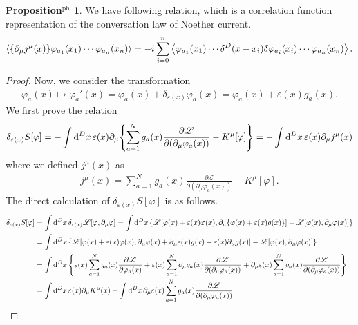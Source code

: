 \documentclass{article}
\theoremstyle{definition}
\newtheorem{propositionph}{Proposition$^\mathrm{ph}$}[section]
\numberwithin{equation}{section}
\renewcommand{\mapsto}{\longmapsto}
\newcommand{\intst}{\int \dd^Dx \,}
\newcommand{\del}{\partial_\mu}
\newcommand{\lag}{\mathscr{L}}
\begin{document}
\begin{propositionph}
  We have following relation, which is a correlation function representation of the conversation law of Noether current.
  \begin{align}
    \ev{\qty{\del j^\mu(x)} \varphi_{a_1}(x_1) \cdots \varphi_{a_n}(x_n)}
    = -i\sum_{i = 0}^{n} \ev{\varphi_{a_1}(x_1) \cdots \delta^D(x - x_i) \delta \varphi_{a_i}(x_i) \cdots \varphi_{a_n}(x_n)}. \label{noether-takahashi-id}
  \end{align}
\end{propositionph}
\begin{proof}
  Now, we consider the transformation
  \begin{align}
    \varphi_a(x) \mapsto \varphi_a'(x) = \varphi_a(x) + \delta_{\varepsilon(x)} \varphi_a(x) = \varphi_a(x) + \varepsilon(x) g_a(x).
  \end{align}
  We first prove the relation
  \begin{align}
    \delta_{\varepsilon(x)} S[\varphi] = - \intst \varepsilon(x) \del \qty{\sum_{a = 1}^{N} g_a(x) \frac{\partial \lag}{\partial(\partial_\mu \varphi_a(x))} - K^\mu[\varphi]}
    = - \intst \varepsilon(x) \del j^\mu(x)
  \end{align}
  where we defined $j^\mu(x)$ as
  \begin{align}
    j^\mu(x) = \sum_{a = 1}^{N} g_a(x) \frac{\partial \lag}{\partial(\partial_\mu \varphi_a(x))} - K^\mu[\varphi].
  \end{align}
  The direct calculation of $\delta_{\varepsilon(x)} S[\varphi]$ is as follows.
  \begin{align}
    \delta_{\varepsilon(x)} S[\varphi]
    &= \intst \delta_{\varepsilon(x)} \lag[\varphi, \del \varphi]
     = \intst \qty{\lag[\varphi(x) + \varepsilon(x)\varphi(x), \del \qty{\varphi(x) + \varepsilon(x)g(x)}] - \lag[\varphi(x), \del \varphi(x)]} \notag \\
    &= \intst \qty{\lag[\varphi(x) + \varepsilon(x)\varphi(x), \del \varphi(x) + \del \varepsilon(x) g(x) + \varepsilon(x) \del g(x)] - \lag[\varphi(x), \del \varphi(x)]} \notag \\
    &= \intst \qty{\varepsilon(x)\sum_{a = 1}^{N}g_a(x) \pdv{\lag}{\varphi_a(x)} + \varepsilon(x)\sum_{a = 1}^{N}\del g_a(x)\pdv{\lag}{(\del \varphi_a(x))}
      + \del \varepsilon(x) \sum_{a = 1}^{N} g_a(x) \pdv{\lag}{(\del\varphi_a(x))}} \notag \\
    &= \intst \varepsilon(x) \del K^\mu(x) + \intst \del \varepsilon(x) \sum_{a = 1}^{N} g_a(x) \pdv{\lag}{(\del\varphi_a(x))}

\end{align}
\end{proof}
\end{document}
